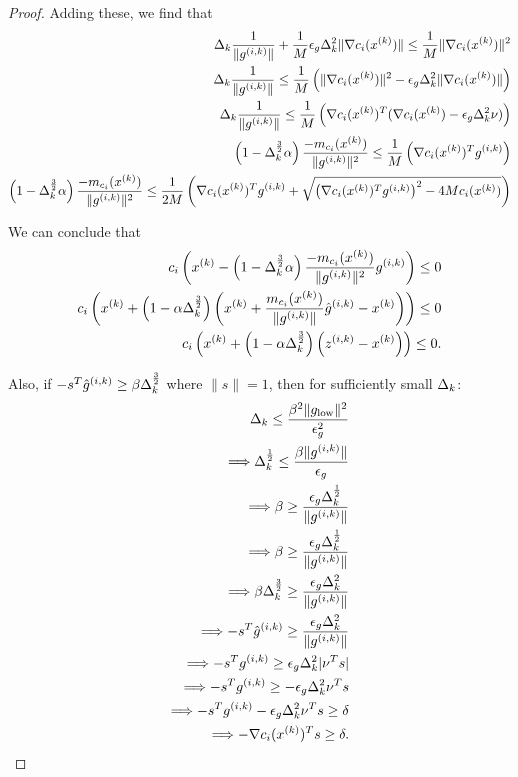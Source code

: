 \begin{proof}
Adding these, we find that
\begin{align*}
\Delta_k \frac{1}{\|{g^{(i, k)}}\|} + \frac{1}{M}\epsilon_g \Delta_k^2\|\nabla c_i({x^{(k)}})\| \le \frac{1}{M}\|\nabla c_i({x^{(k)}})\|^2 \\
\Delta_k \frac{1}{\|{g^{(i, k)}}\|} \le \frac{1}{M}\left(\|\nabla c_i({x^{(k)}})\|^2 - \epsilon_g \Delta_k^2\|\nabla c_i({x^{(k)}})\|\right) \\
\Delta_k \frac{1}{\|{g^{(i, k)}}\|} \le \frac{1}{M}\left(\nabla c_i({x^{(k)}})^T(\nabla c_i({x^{(k)}}) - \epsilon_g \Delta_k^2 \nu)\right) \\
\left(1 - \Delta_k^{\frac 3 2 }\alpha\right)\frac{-m_{c_i}({x^{(k)}})}{\|{g^{(i, k)}}\|^2} \le \frac{1}{M}\left(\nabla c_i({x^{(k)}})^T{g^{(i, k)}}\right) \\
\left(1 - \Delta_k^{\frac 3 2 }\alpha\right)\frac{-m_{c_i}({x^{(k)}})}{\|{g^{(i, k)}}\|^2} \le \frac{1}{2M}\left(\nabla c_i({x^{(k)}})^T{g^{(i, k)}} + \sqrt{\left(\nabla c_i({x^{(k)}})^T{g^{(i, k)}}\right)^2 - 4 M c_i({x^{(k)}})} \right) \\
\end{align*}


We can conclude that
\begin{align*}
c_i\left({x^{(k)}} -\left(1 - \Delta_k^{\frac 3 2 }\alpha\right)\frac{-m_{c_i}({x^{(k)}})}{\|{g^{(i, k)}}\|^2}{g^{(i, k)}}\right) \le 0 \\
c_i\left({x^{(k)}} + \left(1 - \alpha\Delta_k^{\frac 3 2}\right)\left({x^{(k)}} + \frac{m_{c_i}({x^{(k)}})}{\|{g^{(i, k)}}\|}{{\hat g}^{(i, k)}} - {x^{(k)}}\right)\right) \le 0 \\
c_i\left({x^{(k)}} + \left(1 - \alpha\Delta_k^{\frac 3 2}\right)\left({z^{(i, k)}} - {x^{(k)}}\right)\right) \le 0.
\end{align*}



Also, if $-s^T {{\hat g}^{(i, k)}} \ge \beta \Delta_k^{\frac 3 2}$ where $\|s\| = 1$, then for sufficiently small $\Delta_k$:
\begin{align*}
\Delta_k \le \frac{\beta^2\|g_{\text{low}}\|^2}{\epsilon_g^2}  \\
\Longrightarrow \Delta_k^{\frac 1 2 } \le \frac{\beta\|{g^{(i, k)}}\|}{\epsilon_g} \\
\Longrightarrow \beta \ge \frac{\epsilon_{g}\Delta_k^{\frac 1 2}}{\|{g^{(i, k)}}\|} \\
\Longrightarrow \beta \ge \frac{\epsilon_{g}\Delta_k^{\frac 1 2}}{\|{g^{(i, k)}}\|} \\
\Longrightarrow \beta\Delta_k^{\frac 3 2} \ge \frac{\epsilon_{g}\Delta_k^2}{\|{g^{(i, k)}}\|} \\
\Longrightarrow -s^T{{\hat g}^{(i, k)}} \ge \frac{\epsilon_{g}\Delta_k^2}{\|{g^{(i, k)}}\|}  \\
\Longrightarrow -s^T{g^{(i, k)}} \ge \epsilon_{g}\Delta_k^2|\nu^T s| \\
\Longrightarrow -s^T{g^{(i, k)}} \ge -\epsilon_{g}\Delta_k^2\nu^T s \\
\Longrightarrow -s^T{g^{(i, k)}} - \epsilon_{g}\Delta_k^2\nu^T s \ge \delta \\
\Longrightarrow -\nabla c_i({x^{(k)}})^T s \ge \delta.
\end{align*}




\end{proof}
